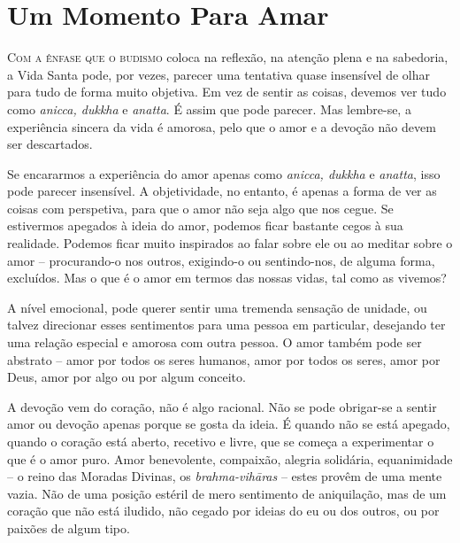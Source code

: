 \chapter{Um Momento Para Amar}

\lettrine{C}{om a ênfase que o budismo} coloca na reflexão, na atenção plena e
na sabedoria, a Vida Santa pode, por vezes, parecer uma tentativa quase
insensível de olhar para tudo de forma muito objetiva. Em vez de sentir as
coisas, devemos ver tudo como \emph{anicca, dukkha} e \emph{anatta}. É assim que
pode parecer. Mas lembre-se, a experiência sincera da vida é amorosa, pelo que
o amor e a devoção não devem ser descartados.

Se encararmos a experiência do amor apenas como \emph{anicca, dukkha} e
\emph{anatta}, isso pode parecer insensível. A objetividade, no entanto, é
apenas a forma de ver as coisas com perspetiva, para que o amor não seja algo
que nos cegue. Se estivermos apegados à ideia do amor, podemos ficar bastante
cegos à sua realidade. Podemos ficar muito inspirados ao falar sobre ele ou ao
meditar sobre o amor -- procurando-o nos outros, exigindo-o ou sentindo-nos,
de alguma forma, excluídos. Mas o que é o amor em termos das nossas vidas, tal
como as vivemos?

A nível emocional, pode querer sentir uma tremenda sensação de unidade, ou
talvez direcionar esses sentimentos para uma pessoa em particular, desejando ter
uma relação especial e amorosa com outra pessoa. O amor também pode ser abstrato
-- amor por todos os seres humanos, amor por todos os seres, amor por Deus, amor
por algo ou por algum conceito.

A devoção vem do coração, não é algo racional. Não se pode obrigar-se a sentir
amor ou devoção apenas porque se gosta da ideia. É quando não se está apegado,
quando o coração está aberto, recetivo e livre, que se começa a experimentar o
que é o amor puro. Amor benevolente, compaixão, alegria solidária, equanimidade
-- o reino das Moradas Divinas, os \emph{brahma-vihāras} -- estes provêm de uma
mente vazia. Não de uma posição estéril de mero sentimento de aniquilação, mas
de um coração que não está iludido, não cegado por ideias do eu ou dos outros,
ou por paixões de algum tipo.

